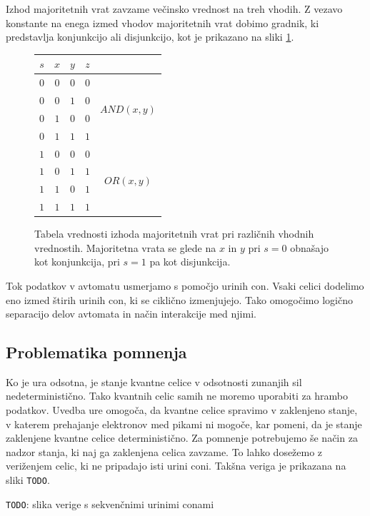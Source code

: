 \documentclass[a4paper, 11pt]{article}
\newcommand{\todo}{\textcolor{BrickRed}{\texttt{TODO}}} %
\begin{document}
Izhod majoritetnih vrat zavzame večinsko vrednost na treh vhodih.
Z vezavo konstante na enega izmed vhodov majoritetnih vrat dobimo gradnik, ki predstavlja konjunkcijo ali disjunkcijo, kot je prikazano na sliki \ref{tab-pregled-major}.

\begin{figure}
	\centering
	\small
	\begin{tabular}{c|c|c||c c}
	$s$ & $x$ & $y$ & $z$ \\
	\hline
	$0$ & $0$ & $0$ & $0$ & \multirow{4}{*}{$AND(x, y)$} \\
	$0$ & $0$ & $1$ & $0$ \\
	$0$ & $1$ & $0$ & $0$ \\
	$0$ & $1$ & $1$ & $1$ \\
	\hline
	$1$ & $0$ & $0$ & $0$ & \multirow{4}{*}{$OR(x, y)$} \\
	$1$ & $0$ & $1$ & $1$ \\
	$1$ & $1$ & $0$ & $1$ \\
	$1$ & $1$ & $1$ & $1$ \\
	\end{tabular}
	\caption{Tabela vrednosti izhoda majoritetnih vrat pri različnih vhodnih vrednostih. Majoritetna vrata se glede na $x$ in $y$ pri $s = 0$ obnašajo kot konjunkcija, pri $s = 1$ pa kot disjunkcija.}
	\label{tab-pregled-major}
\end{figure}

Tok podatkov v avtomatu usmerjamo s pomočjo urinih con.
Vsaki celici dodelimo eno izmed štirih urinih con, ki se ciklično izmenjujejo.
Tako omogočimo logično separacijo delov avtomata in način interakcije med njimi.

\subsection{Problematika pomnenja}

Ko je ura odsotna, je stanje kvantne celice v odsotnosti zunanjih sil nedeterministično.
Tako kvantnih celic samih ne moremo uporabiti za hrambo podatkov.
Uvedba ure omogoča, da kvantne celice spravimo v zaklenjeno stanje, v katerem prehajanje elektronov med pikami ni mogoče, kar pomeni, da je stanje zaklenjene kvantne celice deterministično.
Za pomnenje potrebujemo še način za nadzor stanja, ki naj ga zaklenjena celica zavzame.
To lahko dosežemo z veriženjem celic, ki ne pripadajo isti urini coni.
Takšna veriga je prikazana na sliki \todo.

\todo: slika verige s sekvenčnimi urinimi conami
\end{document}
